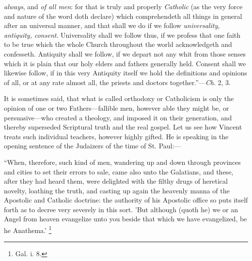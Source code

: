 \emph{always}, and \emph{of all men}: for that is truly and
properly \emph{Catholic} (as the very force and nature of the word doth
declare) which comprehendeth all things in general after an universal
manner, and that shall we do if we follow \emph{universality, antiquity,
consent}. Universality shall we follow thus, if we profess that one
faith to be true which the whole Church throughout the world
acknowledgeth and confesseth. Antiquity shall we follow, if we depart
not any whit from those senses which it is plain that our holy elders
and fathers generally held. Consent shall we likewise follow, if in
this very Antiquity itself we hold the definitions and opinions of
all, or at any rate almost all, the priests and doctors
together.''—\emph{Ch}. 2, 3.

It is sometimes said, that what is called orthodoxy or Catholicism
is only the opinion of one or two Fathers—fallible men, however able
they might be, or persuasive—who created a theology, and imposed it
on their generation, and thereby superseded Scriptural truth and the
real gospel. Let us see how Vincent treats such individual teachers,
however highly gifted. He is speaking in the opening sentence of the
Judaizers of the time of St. Paul:—

``When, therefore, such kind of men, wandering up and down
through provinces and cities to set their errors to sale, came also
unto the Galatians, and these, after they had heard them, were
delighted with the filthy drugs of heretical novelty, loathing the
truth, and casting up again the heavenly manna of the Apostolic and
Catholic doctrine: the authority of his Apostolic office so puts
itself forth as to decree very severely in this sort. 'But although (quoth
he) we or an Angel from heaven evangelize unto you beside that which
we have evangelized, be he Anathema.' \footnote{Gal. i. 8.}

